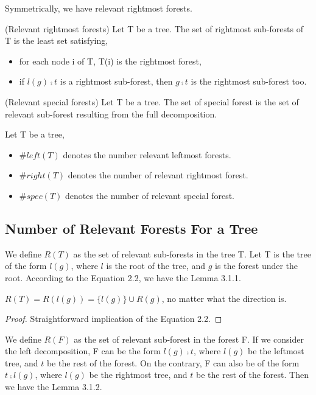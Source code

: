 Symmetrically, we have relevant rightmost forests.

\begin{definition}
(Relevant rightmost forests)
Let T be a tree. The set of rightmost sub-forests of T is the least set satisfying,
\begin{itemize}
\item for each node i of T, T(i) is the rightmost forest,
\item if $l(g) \comp t$ is a rightmost sub-forest, then $g \comp t$ is the rightmost sub-forest too.
\end{itemize}
\end{definition}

\begin{definition}
(Relevant special forests)
Let T be a tree. The set of special forest is the set of relevant sub-forest resulting from the full decomposition.
\end{definition}

\begin{notation}
Let T be a tree,
\begin{itemize}
\item $\#left(T)$ denotes the number relevant leftmost forests.
\item $\#right(T)$ denotes the number of relevant rightmost forest.
\item $\#spec(T)$ denotes the number of relevant special forest.
\end{itemize}
\end{notation}

\subsection{Number of Relevant Forests For a Tree}

We define $R(T)$ as the set of relevant sub-forests in the tree T. Let T is the tree of the form $l(g)$, where $l$ is the root of the tree, and $g$ is the forest under the root. According to the Equation 2.2, we have the Lemma 3.1.1.

\begin{lemma}
$R(T) = R(l(g)) = \{l(g)\} \cup R(g)$, no matter what the direction is.
\end{lemma}

\begin{proof}
Straightforward implication of the Equation 2.2.
\end{proof}

We define $R(F)$ as the set of relevant sub-forest in the forest F. If we consider the left decomposition, F can be the form $l(g) \comp t$, where $l(g)$ be the leftmost tree, and $t$ be the rest of the forest. On the contrary, F can also be of the form $t \comp l(g)$, where $l(g)$ be the rightmost tree, and $t$ be the rest of the forest. Then we have the Lemma 3.1.2.

